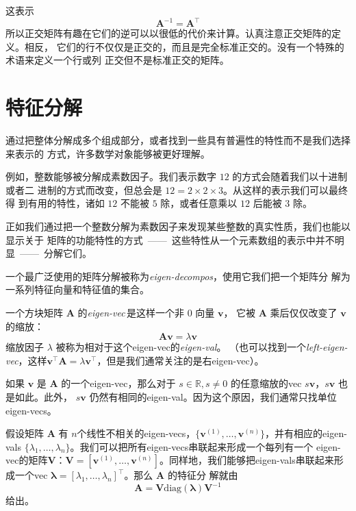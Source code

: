 这表示
\begin{equation}
  \pmb{A}^{-1} = \pmb{A}^{\top}
\end{equation}
所以正交矩阵有趣在它们的逆可以以很低的代价来计算。认真注意正交矩阵的定义。相反，
它们的行不仅仅是正交的，而且是完全标准正交的。没有一个特殊的术语来定义一个行或列
正交但不是标准正交的矩阵。

\section{特征分解}
\label{sec:eigendecomposition}

通过把整体分解成多个组成部分，或者找到一些具有普遍性的特性而不是我们选择来表示的
方式，许多数学对象能够被更好理解。

例如，整数能够被分解成素数因子。我们表示数字 $12$ 的方式会随着我们以十进制或者二
进制的方式而改变，但总会是 $12 = 2 \times 2 \times 3$。从这样的表示我们可以最终得
到有用的特性，诸如 $12$ 不能被 $5$ 除，或者任意乘以 $12$ 后能被 $3$ 除。

正如我们通过把一个整数分解为素数因子来发现某些整数的真实性质，我们也能以显示关于
矩阵的功能特性的方式~——~这些特性从一个元素数组的表示中并不明显~——~分解它们。

一个最广泛使用的矩阵分解被称为\emph{\gls{eigen-decompos}}，使用它我们把一个矩阵分
解为一系列特征向量和特征值的集合。

一个方块矩阵 $\pmb{A}$ 的\emph{\gls{eigen-vec}}\,是这样一个非 $0$ 向量 $\pmb{v}$，
它被 $\pmb{A}$ 乘后仅仅改变了 $\pmb{v}$ 的缩放：
\begin{equation}
  \pmb{A}\pmb{v} = \lambda\pmb{v}
\end{equation}
缩放因子 $\lambda$ 被称为相对于这个\gls*{eigen-vec}的\emph{\gls{eigen-val}}。
（也可以找到一个\emph{\gls{left-eigen-vec}}，这样$\pmb{v}^{\top}\pmb{A} =
  \lambda\pmb{v}^{\top}$，但是我们通常关注的是右\gls*{eigen-vec}）。

如果 $\pmb{v}$ 是 $\pmb{A}$ 的一个\gls*{eigen-vec}，那么对于 $s \in \mathbb{R},
s \neq 0$ 的任意缩放的\gls*{vec} $s\pmb{v}$，$s\pmb{v}$ 也是如此。此外，
$s\pmb{v}$ 仍然有相同的\gls*{eigen-val}。因为这个原因，我们通常只找单位
\gls*{eigen-vecs}。

假设矩阵 $\pmb{A}$ 有 $n$个线性不相关的\gls*{eigen-vecs}，$\{\pmb{v}^{(1)},
\ldots, \pmb{v}^{(n)}\}$，并有相应的\gls*{eigen-vals} $\{\lambda_1, \ldots,
\lambda_n\}$。我们可以把所有\gls*{eigen-vecs}串联起来形成一个每列有一个
\gls*{eigen-vec}的矩阵$\pmb{V}$：$\pmb{V} = [\pmb{v}^{(1)}, \ldots,
  \pmb{v}^{(n)}]$。同样地，我们能够把\gls*{eigen-vals}串联起来形成一个\gls*{vec}
$\pmb{\lambda} = [\lambda_1, \ldots, \lambda_n]^{\top}$。那么 $\pmb{A}$ 的特征分
解就由
\begin{equation}
  \pmb{A} = \pmb{V}\mathrm{diag}(\pmb{\lambda})\pmb{V}^{-1}
\end{equation}
给出。

